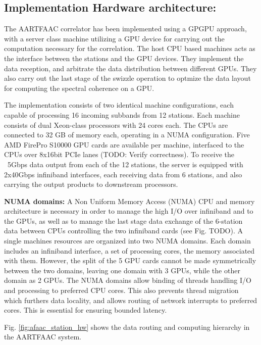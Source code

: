 \documentclass{ws-jai}
\begin{document}
\subsection  {Implementation  Hardware  architecture:} 
The AARTFAAC  correlator has  been implemented  using a  GPGPU approach,  with a
server class  machine utilizing a  GPU device  for carrying out  the computation
necessary  for  the correlation.   The  host  CPU  based  machines acts  as  the
interface between  the stations  and the  GPU devices.  They implement  the data
reception, and arbitrate the data distribution between different GPUs. They also
carry out the last stage of the swizzle operation to optmize the data layout for
computing the spectral coherence on a GPU.

The  implementation  consists  of  two identical  machine  configurations,  each
capable  of processing  16  incoming  subbands from  12  stations. Each  machine
consists  of  dual Xeon-class  processors  with  24  cores  each. The  CPUs  are
connected to 32 GB  of memory each, operating in a  NUMA configuration. Five AMD
FirePro S10000 GPU cards are available  per machine, interfaced to the CPUs over
8x16bit PCIe lanes (TODO: Verify correctness). To receive the ~5Gbps data output
from each  of the 12 stations,  the server is equipped  with 2x40Gbps infiniband
interfaces, each  receiving data from 6  stations, and also carrying  the output
products to downstream processors.

\noindent \textbf  {NUMA domains:}  A  Non Uniform  Memory Access  (NUMA)  CPU and  memory
architecture is necessary in order to manage the high I/O over infiniband and to
the GPUs,  as well as to  manage the last  stage data exchange of  the 6-station
data  between CPUs  controlling the  two infiniband  cards (see  Fig. TODO).   A
single  machines resources  are organized  into two  NUMA domains.   Each domain
includes  an  infiniband  interface,  a  set of  processing  cores,  the  memory
associated with  them. However,  the split  of the  5 GPU  cards cannot  be made
symmetrically between the two domains, leaving one domain with 3 GPUs, while the
other domain as 2 GPUs.  The NUMA  domains allow binding of threads handling I/O
and  processing to  preferred CPU  cores.  This  also prevents  thread migration
which  furthers data  locality,  and  allows routing  of  network interrupts  to
preferred cores. This is essential for ensuring bounded latency.

Fig. \ref{fig:afaac_station_hw}  shows the data routing  and computing hierarchy
in the AARTFAAC system.
\end{document}
